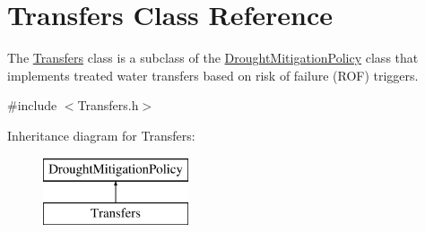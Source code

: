 \hypertarget{classTransfers}{}\section{Transfers Class Reference}
\label{classTransfers}


The {\ttfamily \mbox{\hyperlink{classTransfers}{Transfers}}} class is a subclass of the {\ttfamily \mbox{\hyperlink{classDroughtMitigationPolicy}{Drought\+Mitigation\+Policy}}} class that implements treated water transfers based on risk of failure (R\+OF) triggers.  




{\ttfamily \#include $<$Transfers.\+h$>$}

Inheritance diagram for Transfers\+:\begin{figure}[H]
\begin{center}
\leavevmode
\includegraphics[height=2.000000cm]{classTransfers}
\end{center}
\end{figure}

